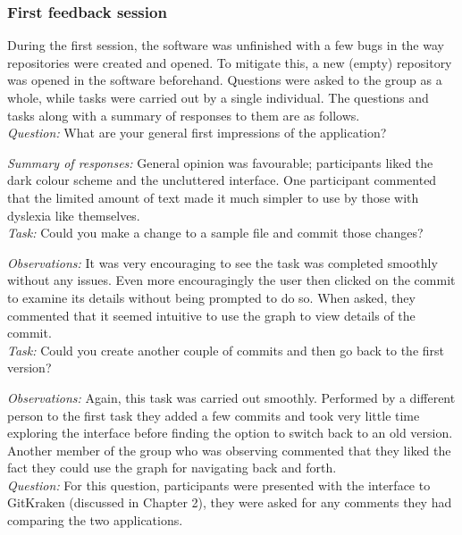 \subsubsection{First feedback session}

During the first session, the software was unfinished with a few bugs in the way repositories were created and opened. To mitigate this, a new (empty) repository was opened in the software beforehand. Questions were asked to the group as a whole, while tasks were carried out by a single individual. The questions and tasks along with a summary of responses to them are as follows.\\

\noindent \emph{Question: } What are your general first impressions of the application?

\noindent \emph{Summary of responses:} General opinion was favourable; participants liked the dark colour scheme and the uncluttered interface. One participant commented that the limited amount of text made it much simpler to use by those with dyslexia like themselves. \\

\noindent \emph{Task: } Could you make a change to a sample file and commit those changes?

\noindent \emph{Observations: } It was very encouraging to see the task was completed smoothly without any issues. Even more encouragingly the user then clicked on the commit to examine its details without being prompted to do so. When asked, they commented that it seemed intuitive to use the graph to view details of the commit.\\

\noindent \emph{Task: } Could you create another couple of commits and then go back to the first version?

\noindent \emph{Observations: } Again, this task was carried out smoothly. Performed by a different person to the first task they added a few commits and took very little time exploring the interface before finding the option to switch back to an old version. Another member of the group who was observing commented that they liked the fact they could use the graph for navigating back and forth.\\

\noindent \emph{Question: } For this question, participants were presented with the interface to GitKraken (discussed in Chapter 2), they were asked for any comments they had comparing the two applications.

